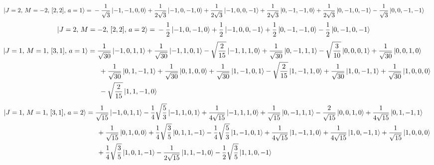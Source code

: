 \documentclass{article}
\begin{document}
\begin{equation*}
\begin{aligned}
\ket{J=2,\,M=-2,\,[2,2],\,a=1} = \; &- \frac{1}{\sqrt{3}} \ket{-1,-1,0,0} + \frac{1}{2\sqrt{3}} \ket{-1,0,-1,0} + \frac{1}{2\sqrt{3}} \ket{-1,0,0,-1} + \frac{1}{2\sqrt{3}} \ket{0,-1,-1,0} + \frac{1}{2\sqrt{3}} \ket{0,-1,0,-1} - \frac{1}{\sqrt{3}} \ket{0,0,-1,-1}
\end{aligned}
\end{equation*}
\begin{equation*}
\begin{aligned}
\ket{J=2,\,M=-2,\,[2,2],\,a=2} = \; &- \frac{1}{2} \ket{-1,0,-1,0} + \frac{1}{2} \ket{-1,0,0,-1} + \frac{1}{2} \ket{0,-1,-1,0} - \frac{1}{2} \ket{0,-1,0,-1}
\end{aligned}
\end{equation*}
{\small
\begin{equation*}
\begin{aligned}
\ket{J=1,\,M=1,\,[3,1],\,a=1} = \; &\frac{1}{\sqrt{30}} \ket{-1,0,1,1} + \frac{1}{\sqrt{30}} \ket{-1,1,0,1} - \sqrt{\frac{2}{15}} \ket{-1,1,1,0} + \frac{1}{\sqrt{30}} \ket{0,-1,1,1} - \sqrt{\frac{3}{10}} \ket{0,0,0,1} + \frac{1}{\sqrt{30}} \ket{0,0,1,0} \\
  & \; + \frac{1}{\sqrt{30}} \ket{0,1,-1,1} + \frac{1}{\sqrt{30}} \ket{0,1,0,0} + \frac{1}{\sqrt{30}} \ket{1,-1,0,1} - \sqrt{\frac{2}{15}} \ket{1,-1,1,0} + \frac{1}{\sqrt{30}} \ket{1,0,-1,1} + \frac{1}{\sqrt{30}} \ket{1,0,0,0} \\
  & \; - \sqrt{\frac{2}{15}} \ket{1,1,-1,0}
\end{aligned}
\end{equation*}}
{\small
\begin{equation*}
\begin{aligned}
\ket{J=1,\,M=1,\,[3,1],\,a=2} = \; &\frac{1}{\sqrt{15}} \ket{-1,0,1,1} - \frac{1}{4}\sqrt{\frac{5}{3}} \ket{-1,1,0,1} + \frac{1}{4\sqrt{15}} \ket{-1,1,1,0} + \frac{1}{\sqrt{15}} \ket{0,-1,1,1} - \frac{2}{\sqrt{15}} \ket{0,0,1,0} + \frac{1}{4\sqrt{15}} \ket{0,1,-1,1} \\
  & \; + \frac{1}{\sqrt{15}} \ket{0,1,0,0} + \frac{1}{4}\sqrt{\frac{3}{5}} \ket{0,1,1,-1} - \frac{1}{4}\sqrt{\frac{5}{3}} \ket{1,-1,0,1} + \frac{1}{4\sqrt{15}} \ket{1,-1,1,0} + \frac{1}{4\sqrt{15}} \ket{1,0,-1,1} + \frac{1}{\sqrt{15}} \ket{1,0,0,0} \\
  & \; + \frac{1}{4}\sqrt{\frac{3}{5}} \ket{1,0,1,-1} - \frac{1}{2\sqrt{15}} \ket{1,1,-1,0} - \frac{1}{2}\sqrt{\frac{3}{5}} \ket{1,1,0,-1}
\end{aligned}
\end{equation*}}
\end{document}
